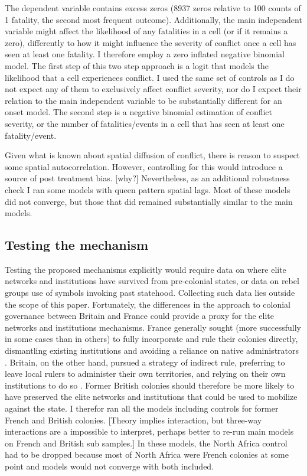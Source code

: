 \documentclass[12pt]{article}
\begin{document}
The dependent variable contains excess zeros (8937 zeros relative to 100 counts
of 1 fatality, the second most frequent outcome). Additionally, the main
independent variable might affect the likelihood of any fatalities in a cell (or
if it remains a zero), differently to how it might influence the severity of
conflict once a cell has seen at least one fatality. I therefore employ a zero
inflated negative binomial model. The first step of this two step approach is a
logit that models the likelihood that a cell experiences conflict. I used the
same set of controls as I do not expect any of them to exclusively affect
conflict severity, nor do I expect their relation to the main independent
variable to be substantially different for an onset model. The second step is a
negative binomial estimation of conflict severity, or the number of
fatalities/events in a cell that has seen at least one fatality/event.

Given what is known about spatial diffusion of conflict, there is reason to
suspect some spatial autocorrelation. However, controlling for this would
introduce a source of post treatment bias. [why?] Nevertheless, as an additional
robustness check I ran some models with queen pattern spatial lags. Most of
these models did not converge, but those that did remained substantially similar
to the main models.

\subsection{Testing the mechanism} \label{Testing the mechanism}

Testing the proposed mechanisms explicitly would require data on where elite
networks and institutions have survived from pre-colonial states, or data on
rebel groups use of symbols invoking past statehood. Collecting such data lies
outside the scope of this paper. Fortunately, the differences in the approach to
colonial governance between Britain and France could provide a proxy for the
elite networks and institutions mechanisms. France generally sought (more
successfully in some cases than in others) to fully incorporate and rule their
colonies directly, dismantling existing institutions and avoiding a reliance on
native administrators \citep{Blanton_2001}. Britain, on the other hand, pursued
a strategy of indirect rule, preferring to leave local rulers to administer
their own territories, and relying on their own institutions to do so
\citep{Blanton_2001}. Former British colonies should therefore be more likely to
have preserved the elite networks and institutions that could be used to
mobilize against the state. I therefor ran all the models including controls for
former French and British colonies. [Theory implies interaction, but three-way
interactions are a impossible to interpret, perhaps better to re-run main models
on French and British sub samples.] In these models, the North Africa control had
to be dropped because most of North Africa were French colonies at some point
and models would not converge with both included. 
\end{document}
